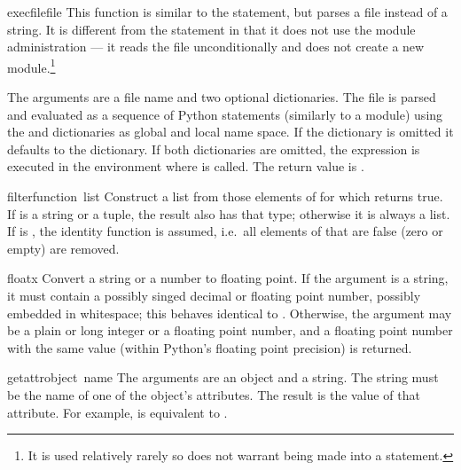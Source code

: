 \begin{funcdesc}{execfile}{file}
  This function is similar to the
   statement, but parses a file instead of a string.  It is
  different from the  statement in that it does not use
  the module administration --- it reads the file unconditionally and
  does not create a new module.\footnote{It is used relatively rarely
  so does not warrant being made into a statement.}

  The arguments are a file name and two optional dictionaries.  The
  file is parsed and evaluated as a sequence of Python statements
  (similarly to a module) using the  and 
  dictionaries as global and local name space.  If the 
  dictionary is omitted it defaults to the  dictionary.
  If both dictionaries are omitted, the expression is executed in the
  environment where  is called.  The return value is
  .
\end{funcdesc}

\begin{funcdesc}{filter}{function\, list}
Construct a list from those elements of  for which
 returns true.  If  is a string or a tuple,
the result also has that type; otherwise it is always a list.  If
 is , the identity function is assumed,
i.e.\ all elements of  that are false (zero or empty) are
removed.
\end{funcdesc}

\begin{funcdesc}{float}{x}
  Convert a string or a number to floating point.  If the argument is a
  string, it must contain a possibly singed decimal or floating point
  number, possibly embedded in whitespace;
  this behaves identical to .
  Otherwise, the argument may be a plain or
  long integer or a floating point number, and a floating point number
  with the same value (within Python's floating point precision) is
  returned.
\end{funcdesc}

\begin{funcdesc}{getattr}{object\, name}
  The arguments are an object and a string.  The string must be the
  name
  of one of the object's attributes.  The result is the value of that
  attribute.  For example,  is equivalent to
  .
\end{funcdesc}

